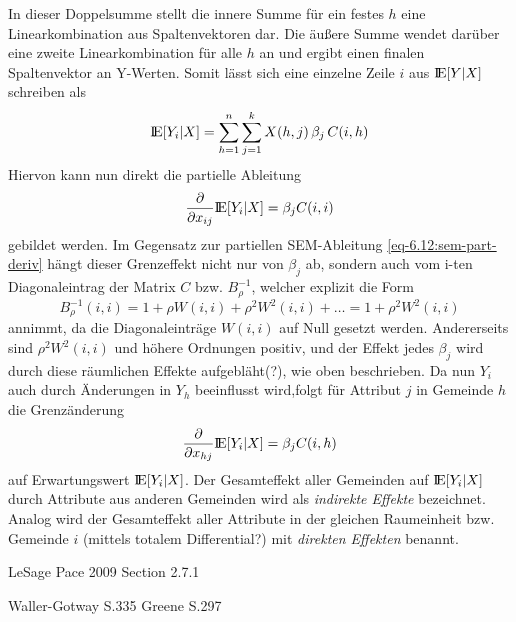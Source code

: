 In dieser Doppelsumme stellt die innere Summe für ein festes $h$ eine Linearkombination 
aus Spaltenvektoren dar. Die äußere Summe wendet darüber eine zweite Linearkombination 
für alle $h$ an und ergibt einen finalen Spaltenvektor an Y-Werten. Somit lässt sich eine 
einzelne Zeile $i$ aus $ {\rm I\!E}[Y|X]$ schreiben als
\begin{equation*}
    {\rm I\!E}[Y_{i}|X] = \sum_{h=1}^{n} \sum_{j=1}^{k}  X(h,j) \, \beta_{j} \, C(i,h)
\end{equation*}
Hiervon kann nun direkt die partielle Ableitung
\begin{equation*}
    \frac{\partial}{\partial x_{ij}} {\rm I\!E}[Y_{i}|X] = \beta_{j} C(i,i)
\end{equation*}
gebildet werden. Im Gegensatz zur partiellen SEM-Ableitung \eqref{eq-6.12:sem-part-deriv} hängt 
dieser Grenzeffekt nicht nur von $\beta_{j}$ ab, sondern 
auch vom i-ten Diagonaleintrag der Matrix $C$ bzw. $B_{\rho}^{-1}$, welcher explizit die Form
\begin{equation*}
    B_{\rho}^{-1}(i,i) = 1 + \rho W(i,i) + \rho^{2} W^{2}(i,i) + \ldots = 1 + \rho^{2} W^{2}(i,i)
\end{equation*}
annimmt, da die Diagonaleinträge $W(i,i)$ auf Null gesetzt werden. Andererseits 
sind $\rho^{2} W^{2}(i,i)$ und höhere Ordnungen positiv, und der Effekt jedes $\beta_{j}$ wird 
durch diese räumlichen Effekte aufgebläht(?), wie oben beschrieben. 
Da nun $Y_{i}$ auch durch Änderungen in $Y_{h}$ beeinflusst wird,folgt für 
Attribut $j$ in Gemeinde $h$ die Grenzänderung
\begin{equation*}
    \frac{\partial}{\partial x_{hj}} {\rm I\!E}[Y_{i}|X] = \beta_{j} C(i,h)
\end{equation*}
auf Erwartungswert ${\rm I\!E}[Y_{i}|X]$. Der Gesamteffekt aller Gemeinden auf ${\rm I\!E}[Y_{i}|X]$ 
durch Attribute aus anderen Gemeinden wird als \emph{indirekte Effekte} bezeichnet. 
Analog wird der Gesamteffekt aller Attribute in der gleichen 
Raumeinheit bzw. Gemeinde $i$ (mittels totalem Differential?) mit \emph{direkten Effekten} benannt.

LeSage Pace 2009 Section 2.7.1


Waller-Gotway S.335
Greene S.297

